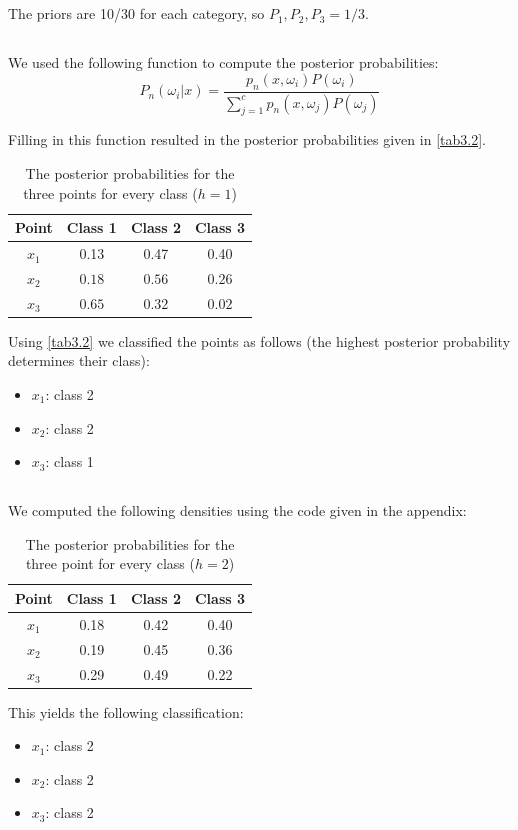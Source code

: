 \documentclass[10pt]{article}
\begin{document}
\subsection{}
The priors are 10/30 for each category, so ${P_1, P_2, P_3} = 1/3$.

\subsection{}
We used the following function to compute the posterior probabilities:
\begin{equation}
 P_n(\omega_i|x) = \frac{p_n(x,\omega_i)P(\omega_i)}{\sum_{j=1}^cp_n(x,\omega_j)P(\omega_j)}
\end{equation}

Filling in this function resulted in the posterior probabilities given in \autoref{tab3.2}.
\begin{table}[H]
 \centering
 \caption{The posterior probabilities for the three points for every class ($h=1$)}
 \begin{tabular}{c|c|c|c}
  Point & Class 1 & Class 2 & Class 3 \\
  \hline
  $x_1$ & 0.13 & 0.47 & 0.40 \\
  $x_2$ & $0.18$ & $0.56$ & $0.26$ \\
  $x_3$ & $0.65$ & $0.32$ & $0.02$ \\
 \end{tabular}
 \label{tab3.2}
\end{table}
Using \autoref{tab3.2} we classified the points as follows (the highest posterior probability determines their class):
\begin{itemize}
 \item $x_1$: class 2
 \item $x_2$: class 2
 \item $x_3$: class 1
\end{itemize}

\subsection{}
We computed the following densities using the code given in the appendix:
\begin{table}[H]
 \centering
 \caption{The posterior probabilities for the three point for every class ($h=2$)}
 \begin{tabular}{c|c|c|c}
  Point & Class 1 & Class 2 & Class 3 \\
  \hline
  $x_1$ & 0.18 & 0.42 & 0.40 \\
  $x_2$ & 0.19 & 0.45 & 0.36 \\
  $x_3$ & 0.29 & 0.49 & 0.22 \\
 \end{tabular}
 \label{tab3.3}
\end{table}
This yields the following classification:
\begin{itemize}
 \item $x_1$: class 2
 \item $x_2$: class 2
 \item $x_3$: class 2
\end{itemize}
\end{document}
